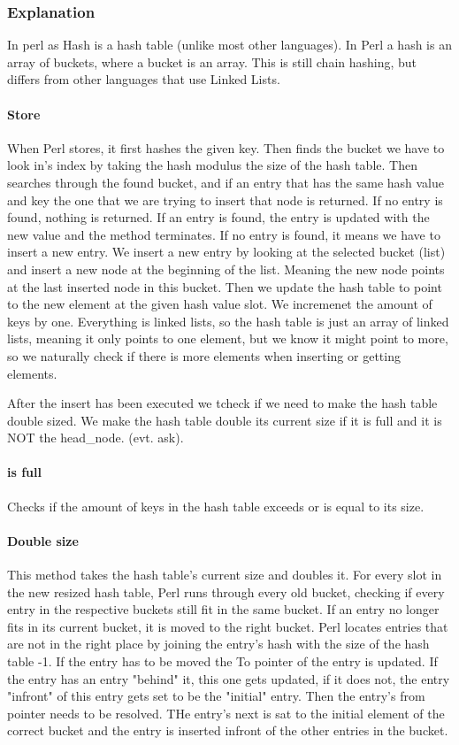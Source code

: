\documentclass[titlepage]{article}
\begin{document}
	\subsubsection{Explanation}
	In perl as Hash is a hash table (unlike most other languages).
	In Perl a hash is an array of buckets, where a bucket is an array. 
	This is still chain hashing, but differs from other languages that use Linked Lists.
	
	\paragraph{Store}
	When Perl stores, it first hashes the given key. Then finds the bucket we have to look in's index by taking the hash modulus the size of the hash table.
	Then searches through the found bucket, and if an entry that has the same hash value and key the one that we are trying to insert that node is returned.
	If no entry is found, nothing is returned. 
	If an entry is found, the entry is updated with the new value and the method terminates.
	If no entry is found, it means we have to insert a new entry.
	We insert a new entry by looking at the selected bucket (list) and insert a new node at the beginning of the list. Meaning the new node points at the 
	last inserted node in this bucket. Then we update the hash table to point to the new element at the given hash value slot. 
	We incremenet the amount of keys by one.
	Everything is linked lists, so the hash table is just an array of linked lists,  meaning it only points to one element, but we know it might point to more,
	so we naturally check if there is more elements when inserting or getting elements. 
	
	After the insert has been executed we tcheck if we need to make the hash table double sized. We make the hash table double its current size if it is full and it is NOT the head\_node. (evt. ask).
	
	\paragraph{is full}
	Checks if the amount of keys in the hash table exceeds or is equal to its size. 
	
	\paragraph{Double size}
	This method takes the hash table's current size and doubles it. 
	For every slot in the new resized hash table, Perl runs through every old bucket, 
	checking if every entry in the respective buckets still fit in the same bucket.
	If an entry no longer fits in its current bucket, it is moved to the right bucket. 
	Perl locates entries that are not in the right place by joining the entry's hash with the size of the hash table -1. 
		If the entry has to be moved the To pointer of the entry is updated. If the entry has an entry "behind" it, this one gets updated, if it does not, the entry "infront" of this entry gets set to be the "initial" entry. 
		Then the entry's from pointer needs to be resolved. THe entry's next is sat to the initial element of the correct bucket and the entry is inserted infront of the other entries in the bucket. 
		 
\end{document}
